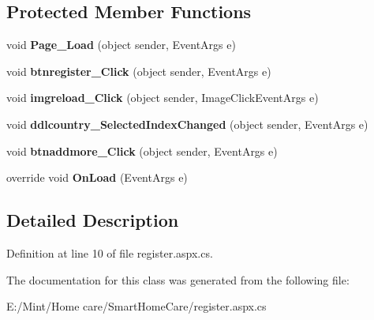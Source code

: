 \subsection*{Protected Member Functions}
\begin{DoxyCompactItemize}
\item 
\hypertarget{classregister_ad970a9929fba7b42ad397e0340ee0e1c}{void {\bfseries Page\-\_\-\-Load} (object sender, Event\-Args e)}\label{classregister_ad970a9929fba7b42ad397e0340ee0e1c}

\item 
\hypertarget{classregister_a72797a079293dcb5e7c36c7827c1df28}{void {\bfseries btnregister\-\_\-\-Click} (object sender, Event\-Args e)}\label{classregister_a72797a079293dcb5e7c36c7827c1df28}

\item 
\hypertarget{classregister_a0bb326361d1b623d58b84a16dbc09c20}{void {\bfseries imgreload\-\_\-\-Click} (object sender, Image\-Click\-Event\-Args e)}\label{classregister_a0bb326361d1b623d58b84a16dbc09c20}

\item 
\hypertarget{classregister_a810466858f623a0f14a2f315fd72bf97}{void {\bfseries ddlcountry\-\_\-\-Selected\-Index\-Changed} (object sender, Event\-Args e)}\label{classregister_a810466858f623a0f14a2f315fd72bf97}

\item 
\hypertarget{classregister_a7dcda88483712ec46037d98673ffb125}{void {\bfseries btnaddmore\-\_\-\-Click} (object sender, Event\-Args e)}\label{classregister_a7dcda88483712ec46037d98673ffb125}

\item 
\hypertarget{classregister_a5d155a94e543c61f4d404d6f4b78ba5c}{override void {\bfseries On\-Load} (Event\-Args e)}\label{classregister_a5d155a94e543c61f4d404d6f4b78ba5c}

\end{DoxyCompactItemize}


\subsection{Detailed Description}


Definition at line 10 of file register.\-aspx.\-cs.



The documentation for this class was generated from the following file\-:\begin{DoxyCompactItemize}
\item 
E\-:/\-Mint/\-Home care/\-Smart\-Home\-Care/register.\-aspx.\-cs\end{DoxyCompactItemize}
